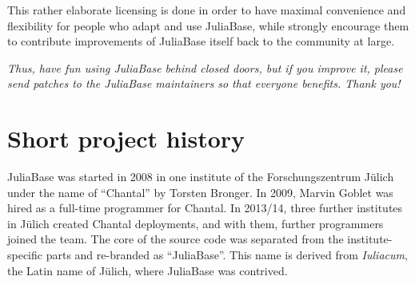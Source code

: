 \documentclass[a4paper,11pt,english]{sphinxmanual}
\let\oldprintindex\printindex
\def\printindex{\raggedright\oldprintindex}
\begin{document}
This rather elaborate licensing is done in order to have maximal convenience
and flexibility for people who adapt and use JuliaBase, while strongly
encourage them to contribute improvements of JuliaBase itself back to the
community at large.

\emph{Thus, have fun using JuliaBase behind closed doors, but if you improve it,
please send patches to the JuliaBase maintainers so that everyone benefits.
Thank you!}


\section{Short project history}
\label{project:short-project-history}\label{project:index-2}
JuliaBase was started in 2008 in one institute of the Forschungszentrum Jülich
under the name of “Chantal” by Torsten Bronger.  In 2009, Marvin Goblet was
hired as a full-time programmer for Chantal.  In 2013/14, three further
institutes in Jülich created Chantal deployments, and with them, further
programmers joined the team.  The core of the source code was separated from
the institute-specific parts and re-branded as “JuliaBase”.  This name is
derived from \emph{Iuliacum}, the Latin name of Jülich, where JuliaBase was
contrived.



\renewcommand{\indexname}{Index}
\printindex
\end{document}
